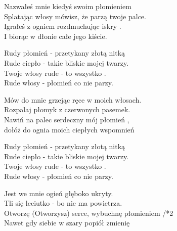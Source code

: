 \begin{text}
    Nazwałeś mnie kiedyś swoim płomieniem\\
    Splatając włosy mówisz, że parzą twoje palce.\\
    Igrałeś z ogniem rozdmuchując iskry .\\
    I biorąc w dłonie całe jego kiście.

    Rudy płomień - przetykany złotą nitką\\
    Rude ciepło - takie bliskie mojej twarzy.\\
    Twoje włosy rude - to wszystko .\\
    Rude włosy - płomień co nie parzy.

    Mów do mnie grzejąc ręce w moich włosach.\\
    Rozpalaj płomyk z czerwonych pasemek.\\
    Nawiń na palec serdeczny mój płomień ,\\
    dołóż do ognia moich ciepłych wspomnień

    Rudy płomień - przetykany złotą nitką\\
    Rude ciepło - takie bliskie mojej twarzy.\\
    Twoje włosy rude - to wszystko .\\
    Rude włosy - płomień co nie parzy.

    Jest we mnie ogień głęboko ukryty.\\
    Tli się leciutko - bo nie ma powietrza.\\
    Otworzę (Otworzysz) serce, wybuchnę płomieniem /*2\\
    Nawet gdy siebie w szary popiół zmienię
\end{text}
\begin{chord}

\end{chord}